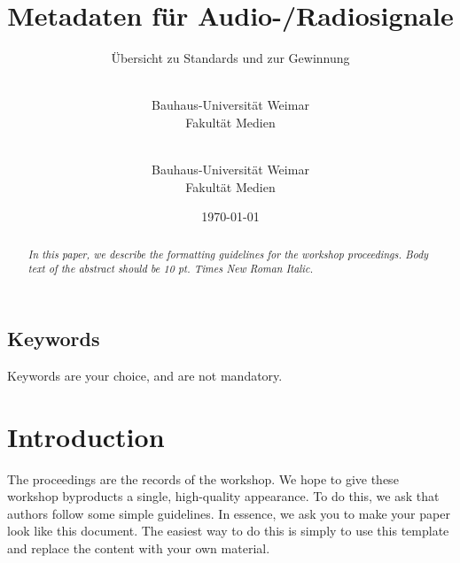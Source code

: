 

\title{Metadaten für Audio-/Radiosignale}
\subtitle{Übersicht zu Standards und zur Gewinnung}
\date{\today}
\author{
	\\
	Bauhaus-Universität Weimar\\
	Fakultät Medien\\
\and
	\\
	Bauhaus-Universität Weimar\\
	Fakultät Medien\\
}



	\maketitle
	
	\begin{abstract}
		\emph{In this paper, we describe the formatting guidelines
		for the workshop proceedings. Body text of the abstract
		should be 10 pt. Times New Roman Italic.}
	\end{abstract}
	
	\subsection{Keywords}
	Keywords are your choice, and are not mandatory.
	
	\section{Introduction}
	The proceedings are the records of the workshop. We hope to
	give these workshop byproducts a single, high-quality
	appearance. To do this, we ask that authors follow some simple
	guidelines. In essence, we ask you to make your paper look like
	this document. The easiest way to do this is simply to use this
	template and replace the content with your own material.
	
